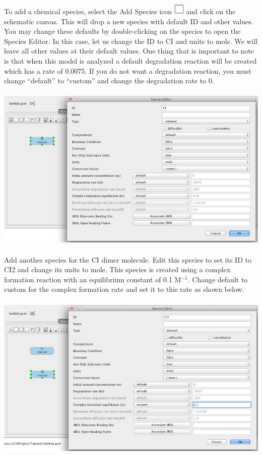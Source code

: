 \documentclass[titlepage,11pt]{article}
\begin{document}
To add a chemical species, select the Add Species icon \includegraphics{../gui/icons/modelview/add_species_selected} and click on the schematic canvas.  This will drop a new species with default ID and other values.  You may change these defaults by double-clicking on the species to open the Species Editor.  In this case, let us change the ID to CI and units to mole.  We will leave all other values at their default values.  One thing that is important to note is that when this model is analyzed a default degradation reaction will be created which has a rate of 0.0075.  If you do not want a degradation reaction, you must change ``default'' to ``custom'' and change the degradation rate to 0.

\begin{center}
\includegraphics[height=80mm]{screenshots/species}
\end{center}

Add another species for the CI dimer molecule.  Edit this species to set its ID to CI2 and change its units to mole.  This species is created using a complex formation reaction with an equilibrium constant of 0.1 M$^{-1}$.  Change default to custom for the complex formation rate and set it to this rate as shown below.

\begin{center}
\includegraphics[height=80mm]{screenshots/species2} 
\end{center}
\end{document}
